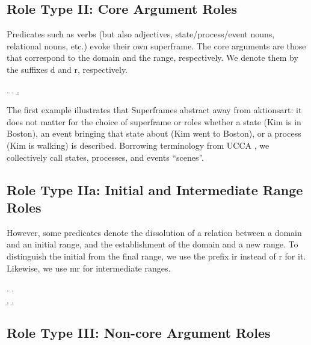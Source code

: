 \documentclass[a4paper]{article}
\begin{document}

\subsection{Role Type II: Core Argument Roles}

Predicates such as verbs (but also adjectives, state/process/event nouns, relational nouns, etc.) evoke their own superframe. The core arguments are those that correspond to the domain and the range, respectively. We denote them by the suffixes \textsf{d} and \textsf{r}, respectively.

\ex. \a. 
     \b. 

The first example illustrates that Superframes abstract away from aktionsart: it does not matter for the choice of superframe or roles whether a state (Kim is in Boston), an event bringing that state about (Kim went to Boston), or a process (Kim is walking) is described. Borrowing terminology from UCCA \citep{abend-rappoport-2013-universal}, we collectively call states, processes, and events ``scenes''.


\subsection{Role Type IIa: Initial and Intermediate Range Roles}

However, some predicates denote the dissolution of a relation between a domain and an initial range, and the establishment of the domain and a new range. To distinguish the initial from the final range, we use the prefix \textsf{ir} instead of \textsf{r} for it. Likewise, we use \textsf{mr} for intermediate ranges.

\ex. \a. \\
     \b. 
     \b. 


\subsection{Role Type III: Non-core Argument Roles}
\end{document}
